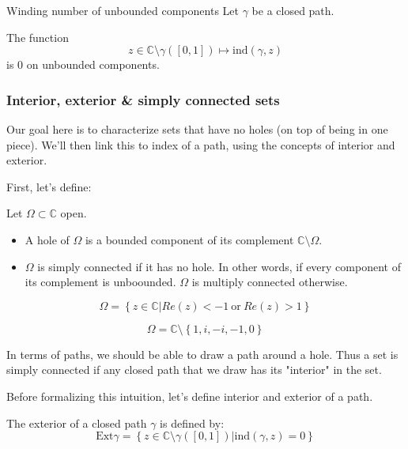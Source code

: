 \begin{thm*}{Winding number of unbounded components}
    Let $\gamma$ be a closed path.

    The function
    $$ z \in \mathbb{C} \setminus \gamma([0,1]) \mapsto \mathrm{ind}(\gamma, z) $$
    is $0$ on unbounded components.
\end{thm*}

\subsubsection{Interior, exterior \& simply connected sets}

Our goal here is to characterize sets that have no holes (on top of being in one piece). We'll then link this to index of a path, using the concepts of interior and exterior.

First, let's define:

\begin{defi}
    Let $\Omega\subset\mathbb{C}$ open.

    \begin{itemize}
        \item A hole of $\Omega$ is a bounded component of its complement $\mathbb{C} \setminus \Omega$.
        \item $\Omega$ is simply connected if it has no hole. In other words, if every component of its complement is unboounded. $\Omega$ is multiply connected otherwise.
    \end{itemize}
\end{defi}

\begin{example}
    $$\Omega = \left\lbrace z \in \mathbb{C} \bigg\vert Re(z) < -1 ~\mathrm{or}~ Re(z) > 1 \right\rbrace$$
\end{example}

\begin{example}
    $$\Omega = \mathbb{C} \setminus \left\lbrace 1, i, -i, -1, 0 \right\rbrace$$
\end{example}

In terms of paths, we should be able to draw a path around a hole. Thus a set is simply connected if any closed path that we draw has its "interior" in the set.

Before formalizing this intuition, let's define interior and exterior of a path.

\begin{defi}
    The exterior of a closed path $\gamma$ is defined by:
    $$ \mathrm{Ext}\gamma = \left\lbrace z \in \mathbb{C} \setminus \gamma([0,1]) \bigg\vert  \mathrm{ind}(\gamma, z) = 0 \right\rbrace$$
\end{defi}

